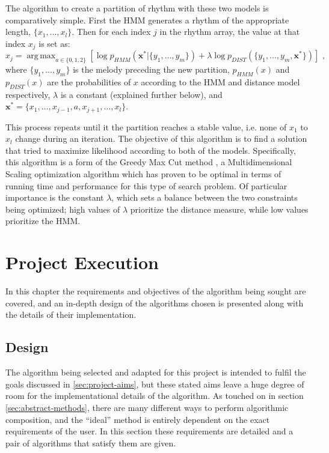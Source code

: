\documentclass[ author={Stephen Livermore-Tozer},
				supervisor={Dr. Peter Flach},
				degree={MEng},
				title={Algorithmic Co-composition Using Machine Learning},
				subtitle={},
				type={research},
				year={2016} ]{dissertation}
\DeclareMathOperator*{\argmax}{arg\,max}
\begin{document}
	The algorithm to create a partition of rhythm with these two models is comparatively simple. First the HMM generates a rhythm of the appropriate length, $\{x_1,\dots,x_l\}$. Then for each index $j$ in the rhythm array, the value at that index $x_j$ is set as:
	$$ x_j = \argmax_{a \in \{0,1,2\}} \left[ \log p_{HMM}(\mathbf{x^*} | \{y_1,\dots,y_m\}) + \lambda \log p_{DIST}(\{y_1,\dots,y_m,\mathbf{x^*}\}) \right] \text{ ,}$$
	where $\{y_1,\dots,y_m\}$ is the melody preceding the new partition, $p_{HMM}(x)$ and $p_{DIST}(x)$ are the probabilities of $x$ according to the HMM and distance model respectively, $\lambda$ is a constant (explained further below), and $\mathbf{x^*} = \{x_1,\dots,x_{j-1},a,x_{j+1},\dots,x_l\}$.
	
	This process repeats until it the partition reaches a stable value, i.e. none of $x_1$ to $x_l$ change during an iteration. The objective of this algorithm is to find a solution that tried to maximize likelihood according to both of the models. Specifically, this algorithm is a form of the Greedy Max Cut method \cite{rohde2002methods}, a Multidimensional Scaling optimization algorithm which has proven to be optimal in terms of running time and performance for this type of search problem. Of particular importance is the constant $\lambda$, which sets a balance between the two constraints being optimized; high values of $\lambda$ prioritize the distance measure, while low values prioritize the HMM.
	
	
	
	\chapter{Project Execution}
	\label{chap:execution}
	
	In this chapter the requirements and objectives of the algorithm being sought are covered, and an in-depth design of the algorithms chosen is presented along with the details of their implementation.
	
	\section{Design}
	
	The algorithm being selected and adapted for this project is intended to fulfil the goals discussed in \ref{sec:project-aims}, but these stated aims leave a huge degree of room for the implementational details of the algorithm. As touched on in section \ref{sec:abstract-methods}, there are many different ways to perform algorithmic composition, and the ``ideal'' method is entirely dependent on the exact requirements of the user. In this section these requirements are detailed and a pair of algorithms that satisfy them are given. 
	
\end{document}
